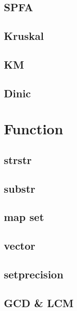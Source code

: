         \subsection{SPFA}
                
        \subsection{Kruskal}
                
        \subsection{KM}
                
        \subsection{Dinic}
                

\section{Function}
        \subsection{strstr}
                
        \subsection{substr}
                
        \subsection{map set}
                
        \subsection{vector}
                
        \subsection{setprecision}
                
        \subsection{GCD & LCM}
                
